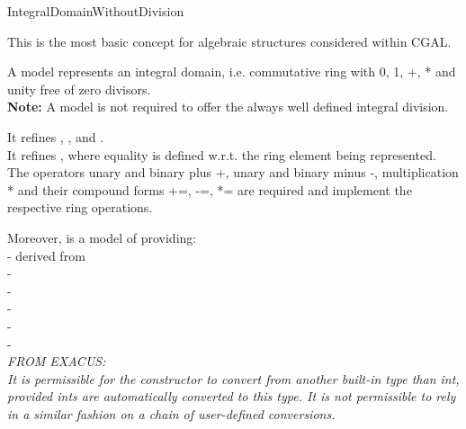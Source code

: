 \begin{ccRefConcept}{IntegralDomainWithoutDivision}


\ccDefinition

This is the most basic concept for algebraic structures considered within CGAL. 

A model   represents an integral domain,
i.e. commutative ring with 0, 1, +, * and unity free of zero divisors.\\ 
{\bf Note:} A model is not required to offer the always well defined integral division.

It refines , , 
and . \\ 
It refines , where equality is defined w.r.t. 
the ring element being represented. \\
The operators unary and binary plus +, unary and binary minus -, 
multiplication * and their compound forms +=, -=, *= are required and 
implement the respective ring operations.

Moreover,  is a model of 
 providing:\\ 
-  derived from  \\
-   \\
-   \\
-   \\
-  \\
-  \\


{ \em \small FROM EXACUS: \\
It is permissible for the constructor 
to convert from another built-in type than int, provided ints are
automatically converted to this type. It is not permissible to 
rely in a similar fashion on a chain of user-defined conversions.
}



\ccRefines
{}\\
\\
\\
\\ 
\\


\end{ccRefConcept}
